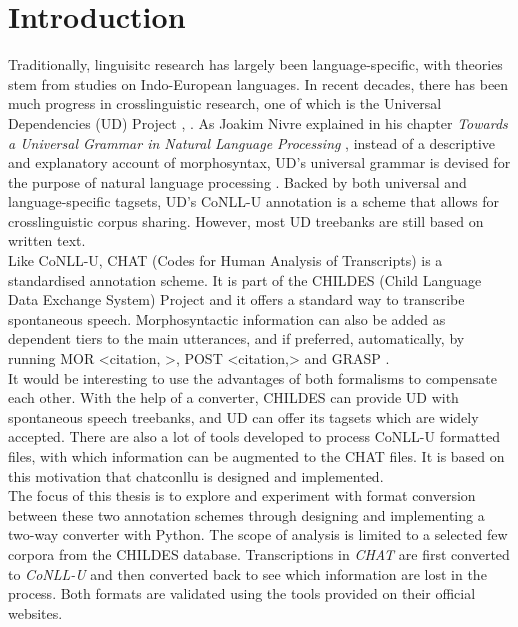 \chapter{Introduction} %

\label{Chapter1} %

Traditionally, linguisitc research has largely been language-specific, with theories stem from studies on Indo-European languages. In recent decades, there has been much progress in crosslinguistic research, one of which is the Universal Dependencies (UD) Project \cite{nivre2016}, \cite{nivre2020}. As Joakim Nivre explained in his chapter \emph{Towards a Universal Grammar in Natural Language Processing} , instead of a descriptive and explanatory account of morphosyntax, UD's universal grammar is devised for the purpose of natural language processing \cite{nivre2015}. Backed by both universal and language-specific tagsets, UD's CoNLL-U annotation is a scheme that allows for crosslinguistic corpus sharing. However, most UD treebanks are still based on written text.\\

Like CoNLL-U, CHAT (Codes for Human Analysis of Transcripts) \cite{Macwhinney2000} is a standardised annotation scheme. It is part of the CHILDES (Child Language Data Exchange System) Project \cite{Macwhinney2000}  and it offers a standard way to transcribe spontaneous speech. Morphosyntactic information can also be added as dependent tiers to the main utterances, and if preferred, automatically, by running MOR <citation, >, POST <citation,> and GRASP \cite{Sagae2004}.\\

It would be interesting to use the advantages of both formalisms to compensate each other. With the help of a converter, CHILDES can provide UD with spontaneous speech treebanks, and UD can offer its tagsets which are widely accepted. There are also a lot of tools developed to process CoNLL-U formatted files, with which information can be augmented to the CHAT files. It is based on this motivation that chatconllu is designed and implemented.\\

The focus of this thesis is to explore and experiment with format conversion between these two annotation schemes through designing and implementing a two-way converter with Python. The scope of analysis is limited to a selected few corpora from the CHILDES database. Transcriptions in \emph{CHAT} are first converted to \emph{CoNLL-U} and then converted back to see which information are lost in the process. Both formats are validated using the tools provided on their official websites.\\

